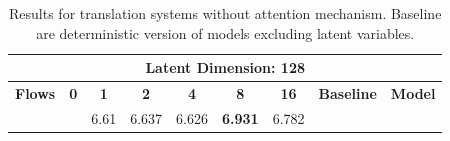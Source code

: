 \begin{table}[]
	\caption{Results for translation systems without attention mechanism. Baseline are deterministic version of models excluding latent variables. }
	\label{tab:de_en_no_attention}
	\begin{tabular}{lllllllll}
	\multicolumn{9}{c}{\textbf{Latent Dimension: 128}}                                                                                                                                                                                                                                                                                                                                                                                                                                                                                                                                                      \\ \hline
	\multicolumn{1}{|l|}{\textbf{Flows}}                          & \multicolumn{1}{c|}{\textbf{0}}                                               & \multicolumn{1}{c|}{\textbf{1}}                             & \multicolumn{1}{c|}{\textbf{2}}                    & \multicolumn{1}{c|}{\textbf{4}}                    & \multicolumn{1}{c|}{\textbf{8}}                             & \multicolumn{1}{c|}{\textbf{16}}                            & \multicolumn{1}{l|}{\textbf{Baseline}}                               & \multicolumn{1}{l|}{\textbf{Model}}                                          \\ \hline
	\rowcolor[HTML]{F9F9E1} 
	\multicolumn{1}{|l|}{\cellcolor[HTML]{F9F9E1}Planar}          & \multicolumn{1}{l|}{\cellcolor[HTML]{F9F9E1}}                                 & \multicolumn{1}{l|}{\cellcolor[HTML]{F9F9E1}6.61}           & \multicolumn{1}{l|}{\cellcolor[HTML]{F9F9E1}6.637} & \multicolumn{1}{l|}{\cellcolor[HTML]{F9F9E1}6.626} & \multicolumn{1}{l|}{\cellcolor[HTML]{F9F9E1}\textbf{6.931}} & \multicolumn{1}{l|}{\cellcolor[HTML]{F9F9E1}6.782}          & \multicolumn{1}{l|}{\cellcolor[HTML]{F9F9E1}}                        & \multicolumn{1}{l|}{\cellcolor[HTML]{F9F9E1}}                                \\ \cline{1-1} \cline{3-7}

\end{tabular}
\end{table}
